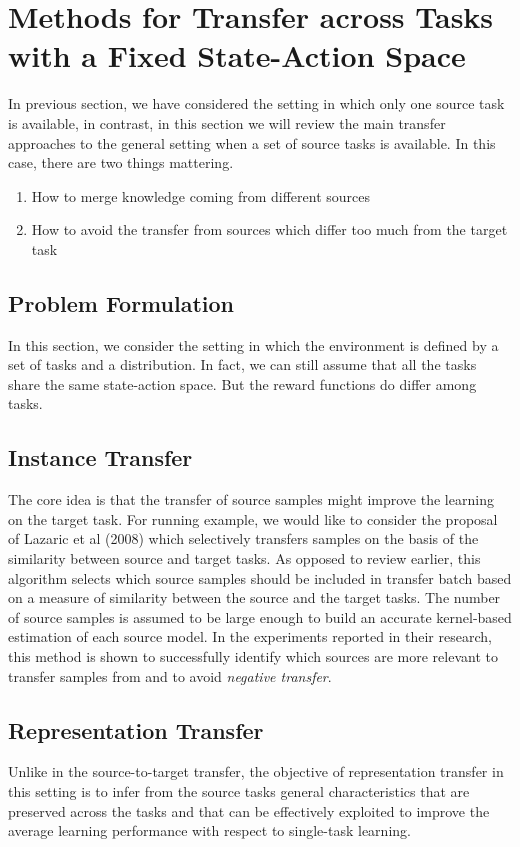 \documentclass{article}
\begin{document}
\section{Methods for Transfer across Tasks with a Fixed State-Action Space}
In previous section, we have considered the setting in which only one source task is available, in contrast, in this section we will review the main transfer approaches to the general setting when a set of source tasks is available. In this case, there are two things mattering.
\begin{enumerate}
    \item How to merge knowledge coming from different sources
    \item How to avoid the transfer from sources which differ too much from the target task
\end{enumerate}

\subsection{Problem Formulation}
In this section, we consider the setting in which the environment is defined by a set of tasks and a distribution. In fact, we can still assume that all the tasks share the same state-action space. But the reward functions do differ among tasks.

\subsection{Instance Transfer}
The core idea is that the transfer of source samples might improve the learning on the target task. For running example, we would like to consider the proposal of Lazaric et al (2008) \cite{lazaric2008transfer} which selectively transfers samples on the basis of the similarity between source and target tasks. As opposed to review earlier, this algorithm selects which source samples should be included in transfer batch based on a measure of similarity between the source and the target tasks. The number of source samples is assumed to be large enough to build an accurate kernel-based estimation of each source model. In the experiments reported in their research, this method is shown to successfully identify which sources are more relevant to transfer samples from and to avoid \textit{negative transfer}.

\subsection{Representation Transfer}
Unlike in the source-to-target transfer, the objective of representation transfer in this setting is to infer from the source tasks general characteristics that are preserved across the tasks and that can be effectively exploited to improve the average learning performance with respect to single-task learning.
\end{document}
